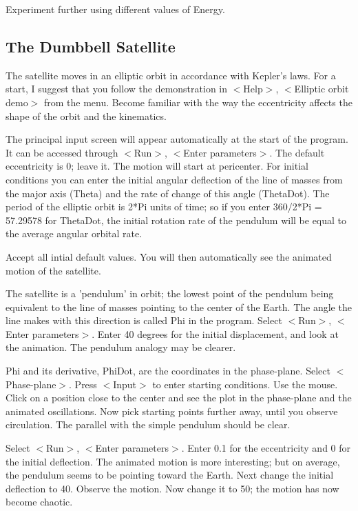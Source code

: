    Experiment further using different values of Energy.



\subsection{The Dumbbell Satellite}

   The satellite moves in an elliptic orbit in accordance with Kepler's
laws. For a start, I suggest that you follow the demonstration in $<$Help$>$,
$<$Elliptic orbit demo$>$ from the menu. Become familiar with the way the
eccentricity affects the shape of the orbit and the kinematics.

   The principal input screen will appear automatically at the start
of the program. It can be accessed through $<$Run$>$, $<$Enter parameters$>$.
The default eccentricity is 0; leave it. The motion will start at
pericenter. For initial conditions you can enter the initial angular
deflection of the line of masses from the major axis (Theta) and the
rate of change of this angle (ThetaDot). The period of the elliptic
orbit is 2*Pi units of time; so if you enter 360/2*Pi = 57.29578 for
ThetaDot, the initial rotation rate of the pendulum will be equal to
the average angular orbital rate.

   Accept all intial default values. You will then automatically see
the animated motion of the satellite.

   The satellite is a 'pendulum' in orbit; the lowest point of the
pendulum being equivalent to the line of masses pointing to the center
of the Earth. The angle the line makes with this direction is called
Phi in the program. Select $<$Run$>$, $<$Enter parameters$>$. Enter 40 degrees
for the initial displacement, and look at the animation. The pendulum
analogy may be clearer.

   Phi and its derivative, PhiDot, are the coordinates in the phase-plane.
Select $<$Phase-plane$>$. Press $<$Input$>$ to enter starting conditions. Use
the mouse. Click on a position close to the center and see the plot in the
phase-plane and the animated oscillations. Now pick starting points
further away, until you observe circulation. The parallel with the
simple pendulum should be clear.

   Select $<$Run$>$, $<$Enter parameters$>$. Enter 0.1 for the eccentricity and
0 for the initial deflection. The animated motion is more interesting;
but on average, the pendulum seems to be pointing toward the Earth.
Next change the initial deflection to 40. Observe the motion. Now change
it to 50; the motion has now become chaotic.

